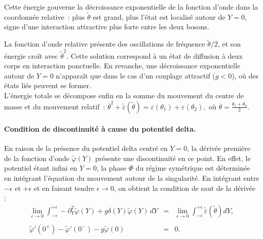 Cette énergie gouverne la décroissance exponentielle de la fonction
d’onde dans la coordonnée relative : plus \(\tilde{\theta}\) est grand,
plus l’état est localisé autour de \(Y=0\), signe d’une interaction
attractive plus forte entre les deux bosons.

La fonction d’onde relative présente des oscillations de fréquence \(\tilde{\theta}/2\), et son énergie croît avec \(\tilde{\theta}^2\). Cette solution correspond à un état de diffusion à deux corps en interaction ponctuelle. En revanche, une décroissance exponentielle autour de $Y=0$ n’apparaît que dans le cas d’un couplage attractif ($g<0$), où des états liés peuvent se former.\\


L’énergie totale se décompose enfin en la somme du mouvement du centre
de masse et du mouvement relatif :
\(
   \overline{\theta}^{2}
   +
   \tilde{\varepsilon}(\tilde{\theta})
   =
   \varepsilon(\theta_{1})
   +
   \varepsilon(\theta_{2}),
\)
 où \(\overline{\theta}= \tfrac{\theta_{1}+\theta_{2}}{2}\).


\paragraph{Condition de discontinuité à cause du potentiel delta.}
En raison de la présence du potentiel delta centré en $Y = 0$, la dérivée première de la fonction d’onde $\tilde{\varphi}(Y)$ présente une discontinuité en ce point. En effet, le potentiel étant infini en $Y = 0$, la phase $\Phi$ du régime symétrique est déterminée en intégrant l’équation du mouvement autour de la singularité. En intégrant entre $- \epsilon$ et $+ \epsilon$ et en faisant tendre $\epsilon \to 0$, on obtient la condition de saut de la dérivée :
\begin{eqnarray*}
	\underset{ \epsilon \to 0 }{\lim} \int_{-\epsilon}^{+\epsilon}  - 	\partial_Y^2\tilde{\varphi}(Y) + g \delta ( Y )\tilde{\varphi}(Y) \, dY  & = & \underset{ \epsilon \to 0 }{\lim}  \int_{-\epsilon}^{+\epsilon}  \tilde{\varepsilon}(\tilde{\theta})d Y ,\\
	\\
	\tilde{\varphi}'(0^+) - \tilde{\varphi}'(0^-) - g \tilde{\varphi} (  0 ) & = & 0 .
\end{eqnarray*}


